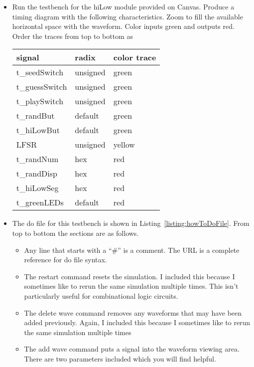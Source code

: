 \begin{itemize}
    \item
        Run the testbench for the hiLow module provided on Canvas. Produce a
        timing diagram with the following characteristics. Zoom to fill the
        available horizontal space with the waveform. Color inputs green and
        outputs red. Order the traces from top to bottom as

        \begin{tabular}{p{4cm}p{4cm}p{4cm}}
            signal & radix & color trace \\ \hline
            t\_seedSwitch     &    unsigned     & green \\
            t\_guessSwitch     &    unsigned     & green \\
            t\_playSwitch     &     unsigned     & green \\
            t\_randBut     &     default     & green \\
            t\_hiLowBut     &    default     & green \\
            LFSR         &     unsigned     & yellow\\
            t\_randNum     &    hex         & red \\
            t\_randDisp     &     hex         & red \\
            t\_hiLowSeg     &    hex         & red \\
            t\_greenLEDs     &    default     & red \\
        \end{tabular}

    \item
        The do file for this testbench is shown in Listing~\ref{listing:howToDoFile}. From top to
        bottom the sections are as follows.

        \begin{itemize}
            \item
                Any line that starts with a ``\#'' is a comment. The URL is a
                complete reference for do file syntax.
            \item
                The restart command resets the simulation. I included this because I
                sometimes like to rerun the same simulation multiple times. This
                isn't particularly useful for combinational logic circuits.
            \item
                The delete wave command removes any waveforms that may have been
                added previously. Again, I included this because I sometimes like to
                rerun the same simulation multiple times
            \item
                The add wave command puts a signal into the waveform viewing area.
                There are two parameters included which you will find helpful.


\end{itemize}
\end{itemize}
